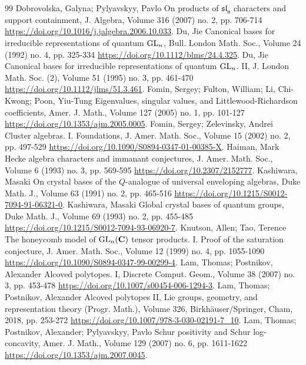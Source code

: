 \begin{thebibliography}{99}
 Dobrovolska, Galyna; Pylyavskyy, Pavlo On products of $\mathfrak{sl}_{\mathfrak{n}}$ characters and support containment, J. Algebra, Volume 316 (2007) no. 2, pp. 706-714 \url{https://doi.org/10.1016/j.jalgebra.2006.10.033}.
 Du, Jie Canonical bases for irreducible representations of quantum ${\rm {GL}}_n$, Bull. London Math. Soc., Volume 24 (1992) no. 4, pp. 325-334 \url{https://doi.org/10.1112/blms/24.4.325}.
 Du, Jie Canonical bases for irreducible representations of quantum ${\rm {GL}}_n$. II, J. London Math. Soc. (2), Volume 51 (1995) no. 3, pp. 461-470 \url{https://doi.org/10.1112/jlms/51.3.461}.
 Fomin, Sergey; Fulton, William; Li, Chi-Kwong; Poon, Yiu-Tung Eigenvalues, singular values, and Littlewood-Richardson coefficients, Amer. J. Math., Volume 127 (2005) no. 1, pp. 101-127 \url{https://doi.org/10.1353/ajm.2005.0005}.
 Fomin, Sergey; Zelevinsky, Andrei Cluster algebras. I. Foundations, J. Amer. Math. Soc., Volume 15 (2002) no. 2, pp. 497-529 \url{https://doi.org/10.1090/S0894-0347-01-00385-X}.
 Haiman, Mark Hecke algebra characters and immanant conjectures, J. Amer. Math. Soc., Volume 6 (1993) no. 3, pp. 569-595 \url{https://doi.org/10.2307/2152777}.
 Kashiwara, Masaki On crystal bases of the ${Q}$-analogue of universal enveloping algebras, Duke Math. J., Volume 63 (1991) no. 2, pp. 465-516 \url{https://doi.org/10.1215/S0012-7094-91-06321-0}.
 Kashiwara, Masaki Global crystal bases of quantum groups, Duke Math. J., Volume 69 (1993) no. 2, pp. 455-485 \url{https://doi.org/10.1215/S0012-7094-93-06920-7}.
 Knutson, Allen; Tao, Terence The honeycomb model of ${\rm {GL}}_n({\bf {C}})$ tensor products. I. Proof of the saturation conjecture, J. Amer. Math. Soc., Volume 12 (1999) no. 4, pp. 1055-1090 \url{https://doi.org/10.1090/S0894-0347-99-00299-4}.
 Lam, Thomas; Postnikov, Alexander Alcoved polytopes. I, Discrete Comput. Geom., Volume 38 (2007) no. 3, pp. 453-478 \url{https://doi.org/10.1007/s00454-006-1294-3}.
 Lam, Thomas; Postnikov, Alexander Alcoved polytopes II, Lie groups, geometry, and representation theory (Progr. Math.), Volume 326, Birkhäuser/Springer, Cham, 2018, pp. 253-272 \url{https://doi.org/10.1007/978-3-030-02191-7_10}.
 Lam, Thomas; Postnikov, Alexander; Pylyavskyy, Pavlo Schur positivity and Schur log-concavity, Amer. J. Math., Volume 129 (2007) no. 6, pp. 1611-1622 \url{https://doi.org/10.1353/ajm.2007.0045}.

\end{thebibliography}
